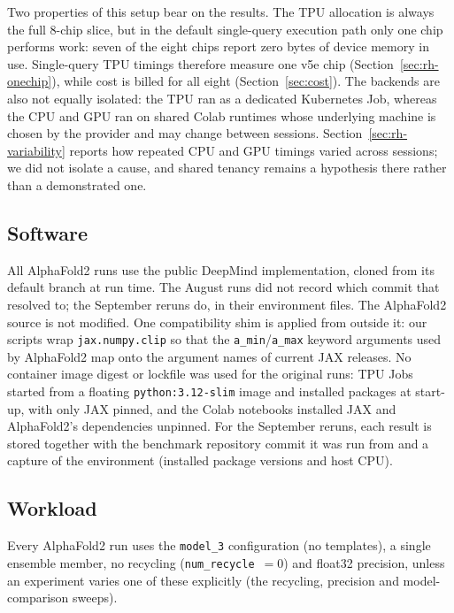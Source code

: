 Two properties of this setup bear on the results. The TPU allocation
is always the full 8-chip slice, but in the default single-query
execution path only one chip performs work: seven of the eight chips
report zero bytes of device memory in use. Single-query TPU timings
therefore measure one v5e chip (Section~\ref{sec:rh-onechip}), while
cost is billed for all eight (Section~\ref{sec:cost}). The backends are
also not equally isolated: the TPU ran as a dedicated Kubernetes
Job, whereas the CPU and GPU ran on shared Colab runtimes whose
underlying machine is chosen by the provider and may change between
sessions. Section~\ref{sec:rh-variability} reports how repeated CPU and
GPU timings varied across sessions; we did not isolate a cause, and
shared tenancy remains a hypothesis there rather than a demonstrated
one.

\subsection{Software}
\label{sec:meth-software}

All AlphaFold2 runs use the public DeepMind implementation, cloned from
its default branch at run time. The August runs did not record which
commit that resolved to; the September reruns do, in their environment
files. The AlphaFold2 source is not modified. One compatibility shim
is applied from outside it: our scripts wrap \texttt{jax.numpy.clip} so
that the \texttt{a\_min}/\texttt{a\_max} keyword arguments used by
AlphaFold2 map onto the argument names of current JAX releases. No
container image digest or lockfile was used for the original runs: TPU
Jobs started from a floating \texttt{python:3.12-slim} image and
installed packages at start-up, with only JAX pinned, and the Colab
notebooks installed JAX and AlphaFold2's dependencies unpinned. For the
September reruns, each result is stored together with the benchmark
repository commit it was run from and a capture of the environment
(installed package versions and host CPU).

\subsection{Workload}
\label{sec:meth-workload}

Every AlphaFold2 run uses the \texttt{model\_3} configuration (no
templates), a single ensemble member, no recycling
(\texttt{num\_recycle}~$=0$) and float32 precision, unless an experiment
varies one of these explicitly (the recycling, precision and
model-comparison sweeps).

